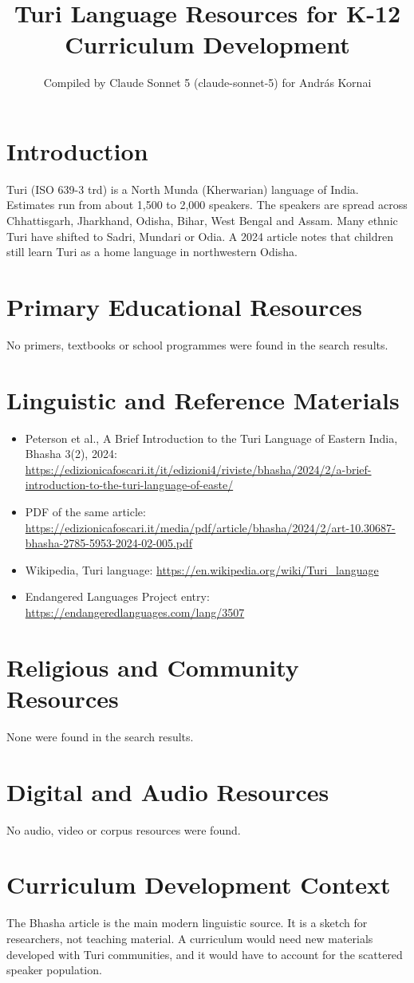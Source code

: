 \documentclass[12pt]{article}
\title{Turi Language Resources for K-12 Curriculum Development}
\author{Compiled by Claude Sonnet 5 (claude-sonnet-5) for Andr\'as Kornai}
\date{}
\begin{document}
\maketitle
\section{Introduction}
Turi (ISO 639-3 trd) is a North Munda (Kherwarian) language of India. Estimates run from about 1,500 to 2,000 speakers. The speakers are spread across Chhattisgarh, Jharkhand, Odisha, Bihar, West Bengal and Assam. Many ethnic Turi have shifted to Sadri, Mundari or Odia. A 2024 article notes that children still learn Turi as a home language in northwestern Odisha.
\section{Primary Educational Resources}
No primers, textbooks or school programmes were found in the search results.
\section{Linguistic and Reference Materials}
\begin{itemize}
\item Peterson et al., A Brief Introduction to the Turi Language of Eastern India, Bhasha 3(2), 2024: \url{https://edizionicafoscari.it/it/edizioni4/riviste/bhasha/2024/2/a-brief-introduction-to-the-turi-language-of-easte/}
\item PDF of the same article: \url{https://edizionicafoscari.it/media/pdf/article/bhasha/2024/2/art-10.30687-bhasha-2785-5953-2024-02-005.pdf}
\item Wikipedia, Turi language: \url{https://en.wikipedia.org/wiki/Turi_language}
\item Endangered Languages Project entry: \url{https://endangeredlanguages.com/lang/3507}
\end{itemize}
\section{Religious and Community Resources}
None were found in the search results.
\section{Digital and Audio Resources}
No audio, video or corpus resources were found.
\section{Curriculum Development Context}
The Bhasha article is the main modern linguistic source. It is a sketch for researchers, not teaching material. A curriculum would need new materials developed with Turi communities, and it would have to account for the scattered speaker population.
\end{document}
